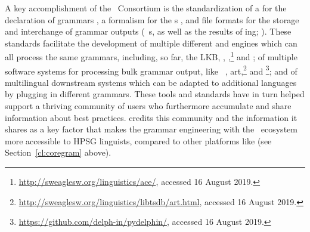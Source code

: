 \documentclass[output=paper
	        ,collection
	        ,collectionchapter
 	        ,biblatex
                ,babelshorthands
                ,newtxmath
                ,draftmode
                ,colorlinks, citecolor=brown
]{langscibook}
\begin{document}
A key accomplishment of the \delphin\ Consortium is the standardization
of a  for the declaration of grammars
\citep{Copestake:02:CLE}, a formalism for the s
\citep{CFPS2005a}, and file formats for the storage and interchange of
grammar outputs (\eg\ s,
as well as the results of ing; \citealt{Oepen:01,OFTM2004a-u}).
These standards facilitate the development of multiple different
 and  engines which can all process the same grammars,
including, so far,
the LKB\indexlkb \citep{Copestake2002a},
 \citep{callmeier00},
,\footnote{\url{http://sweaglesw.org/linguistics/ace/}, accessed 16 August 2019.}
and  \citep{Slayden2012a-u};
of multiple software systems for processing bulk grammar output,
like \itsdb\ \citep{Oepen:01},\is{\itsdb}
art,\footnote{\url{http://sweaglesw.org/linguistics/libtsdb/art.html}, accessed 16 August 2019.} and \footnote{\url{https://github.com/delph-in/pydelphin/}, accessed 16 August 2019.};
and of multilingual downstream systems which can be adapted to additional
languages by plugging in different grammars.
These tools and standards have in turn helped support a thriving community
of users who furthermore accumulate and share information about best practices.
\citet[234]{MelnikHandWritten} credits this community and the information it
shares as a key factor that makes the grammar engineering with the
\delphin\ ecosystem more accessible to HPSG linguists, 
compared to other platforms like  (see Section~\ref{cl:coregram} above).
\end{document}
